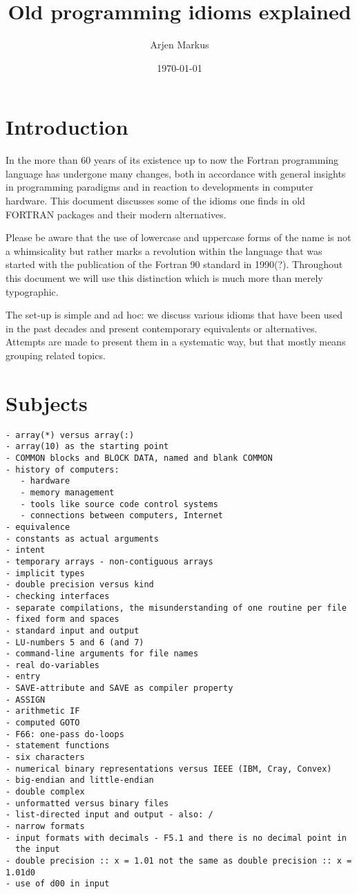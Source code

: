 \documentclass{article}
\date{\today}
\author{Arjen Markus}
\title{Old programming idioms explained}
\begin{document}
\maketitle

\section{Introduction}
In the more than 60 years of its existence up to now the Fortran programming
language has undergone many changes, both in accordance with general insights
in programming paradigms and in reaction to developments in computer hardware.
This document discusses some of the idioms one finds in old FORTRAN packages
and their modern alternatives.

Please be aware that the use of lowercase and uppercase forms of the name is
not a whimsicality but rather marks a revolution within the language that was
started with the publication of the Fortran 90 standard in 1990(?). Throughout
this document we will use this distinction which is much more than merely
typographic.

The set-up is simple and ad hoc: we discuss various idioms that have been
used in the past decades and present contemporary equivalents or alternatives.
Attempts are made to present them in a systematic way, but that mostly means grouping
related topics.






\section{Subjects}
\begin{verbatim}
- array(*) versus array(:)
- array(10) as the starting point
- COMMON blocks and BLOCK DATA, named and blank COMMON
- history of computers:
   - hardware
   - memory management
   - tools like source code control systems
   - connections between computers, Internet
- equivalence
- constants as actual arguments
- intent
- temporary arrays - non-contiguous arrays
- implicit types
- double precision versus kind
- checking interfaces
- separate compilations, the misunderstanding of one routine per file
- fixed form and spaces
- standard input and output
- LU-numbers 5 and 6 (and 7)
- command-line arguments for file names
- real do-variables
- entry
- SAVE-attribute and SAVE as compiler property
- ASSIGN
- arithmetic IF
- computed GOTO
- F66: one-pass do-loops
- statement functions
- six characters
- numerical binary representations versus IEEE (IBM, Cray, Convex)
- big-endian and little-endian
- double complex
- unformatted versus binary files
- list-directed input and output - also: /
- narrow formats
- input formats with decimals - F5.1 and there is no decimal point in
  the input
- double precision :: x = 1.01 not the same as double precision :: x = 1.01d0
- use of d00 in input
\end{verbatim}
\end{document}
